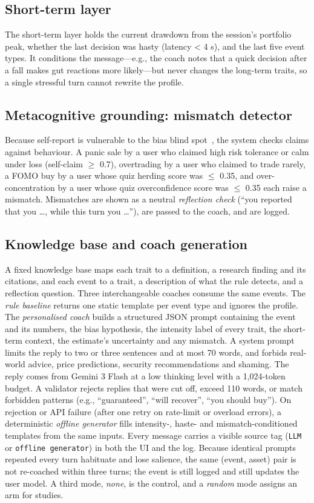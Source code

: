 \documentclass[conference]{IEEEtran}
\begin{document}
\subsection{Short-term layer}
The short-term layer holds the current drawdown from the session's portfolio peak, whether the last decision was hasty (latency \textless{} 4 s), and the last five event types. It conditions the message---e.g., the coach notes that a quick decision after a fall makes gut reactions more likely---but never changes the long-term traits, so a single stressful turn cannot rewrite the profile.

\subsection{Metacognitive grounding: mismatch detector}
Because self-report is vulnerable to the bias blind spot~\cite{pronin02}, the system checks claims against behaviour. A panic sale by a user who claimed high risk tolerance or calm under loss (self-claim \ensuremath{\geq} 0.7), overtrading by a user who claimed to trade rarely, a FOMO buy by a user whose quiz herding score was \ensuremath{\leq} 0.35, and over-concentration by a user whose quiz overconfidence score was \ensuremath{\leq} 0.35 each raise a mismatch. Mismatches are shown as a neutral \textit{reflection check} (``you reported that you \ldots{}, while this turn you \ldots{}''), are passed to the coach, and are logged.

\subsection{Knowledge base and coach generation}
A fixed knowledge base maps each trait to a definition, a research finding and its citations, and each event to a trait, a description of what the rule detects, and a reflection question. Three interchangeable coaches consume the same events. The \textit{rule baseline} returns one static template per event type and ignores the profile. The \textit{personalised coach} builds a structured JSON prompt containing the event and its numbers, the bias hypothesis, the intensity label of every trait, the short-term context, the estimate's uncertainty and any mismatch. A system prompt limits the reply to two or three sentences and at most 70 words, and forbids real-world advice, price predictions, security recommendations and shaming. The reply comes from Gemini 3 Flash at a low thinking level with a 1,024-token budget. A validator rejects replies that were cut off, exceed 110 words, or match forbidden patterns (e.g., ``guaranteed'', ``will recover'', ``you should buy''). On rejection or API failure (after one retry on rate-limit or overload errors), a deterministic \textit{offline generator} fills intensity-, haste- and mismatch-conditioned templates from the same inputs. Every message carries a visible source tag (\texttt{LLM} or \texttt{offline generator}) in both the UI and the log. Because identical prompts repeated every turn habituate and lose salience, the same (event, asset) pair is not re-coached within three turns; the event is still logged and still updates the user model. A third mode, \textit{none}, is the control, and a \textit{random} mode assigns an arm for studies.
\end{document}

